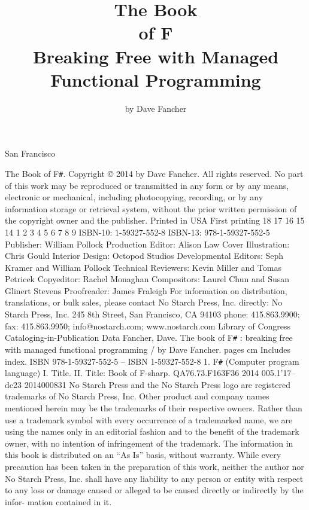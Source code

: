 \documentclass{book}
\begin{document}
\pagestyle{empty}
\title{The Book\\of F\\Breaking Free with Managed \\Functional Programming}
\author{by Dave Fancher}
\maketitle


San Francisco








The Book of F\verb|#|. Copyright © 2014 by Dave Fancher.
All rights reserved. No part of this work may be reproduced or transmitted in any form or by any means, electronic
or mechanical, including photocopying, recording, or by any information storage or retrieval system, without the
prior written permission of the copyright owner and the publisher.
Printed in USA
First printing
18 17 16 15 14   1 2 3 4 5 6 7 8 9
ISBN-10: 1-59327-552-8
ISBN-13: 978-1-59327-552-5
Publisher: William Pollock
Production Editor: Alison Law
Cover Illustration: Chris Gould
Interior Design: Octopod Studios
Developmental Editors: Seph Kramer and William Pollock
Technical Reviewers: Kevin Miller and Tomas Petricek
Copyeditor: Rachel Monaghan
Compositors: Laurel Chun and Susan Glinert Stevens
Proofreader: James Fraleigh
For information on distribution, translations, or bulk sales, please contact No Starch Press, Inc. directly:
No Starch Press, Inc.
245 8th Street, San Francisco, CA 94103
phone: 415.863.9900; fax: 415.863.9950; info@nostarch.com; www.nostarch.com
Library of Congress Cataloging-in-Publication Data
Fancher, Dave.
The book of F\verb|#| : breaking free with managed functional programming / by Dave Fancher.
pages cm
Includes index.
ISBN 978-1-59327-552-5 -- ISBN 1-59327-552-8
1. F\verb|#| (Computer program language) I. Title. II. Title: Book of F-sharp.
QA76.73.F163F36 2014
005.1'17--dc23
2014000831
No Starch Press and the No Starch Press logo are registered trademarks of No Starch Press, Inc. Other product and
company names mentioned herein may be the trademarks of their respective owners. Rather than use a trademark
symbol with every occurrence of a trademarked name, we are using the names only in an editorial fashion and to
the benefit of the trademark owner, with no intention of infringement of the trademark.
The information in this book is distributed on an “As Is” basis, without warranty. While every precaution has been
taken in the preparation of this work, neither the author nor No Starch Press, Inc. shall have any liability to any
person or entity with respect to any loss or damage caused or alleged to be caused directly or indirectly by the infor-
mation contained in it.
\end{document}
